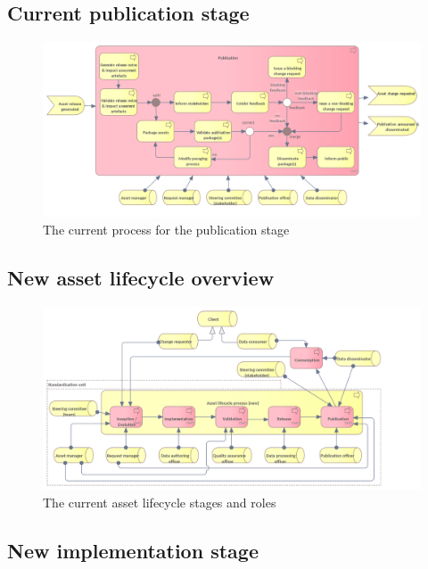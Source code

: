 	\subsection{Current publication stage}
	\label{sec:publication-current}
		\begin{figure}[h]
		\centering
		\includegraphics[width=1.01\textwidth]{images/business/current/Publication.png}
		\caption{The current process for the publication stage}
		\label{fig:publication-current}
	\end{figure}
	
	\subsection{New asset lifecycle overview}
	\label{sec:lifecycle-new}
	
	\begin{figure}[h]
		\centering
		\includegraphics[width=1.05\textwidth]{images/business/Lifecycle (new).png}
		\caption{The current asset lifecycle stages and roles}
		\label{fig:lifecycle-new}
	\end{figure} 	

	\subsection{New implementation stage}
	\label{sec:implementation-new}

